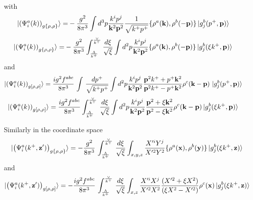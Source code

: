 \documentclass[10pt]{article}
\def\v#1{\mathbf{#1}}
\numberwithin{equation}{section}
\begin{document}
with 
\begin{align}\label{onegrho3mom}
\ket{ \left(\Psi^{a}_{i}(k) \right)_{g \{\rho, \rho\} } }
 = &  
 - \frac{g^2}{8\pi^3}%
  \int d^3p\frac{k^{i}p^{j}} {\v{k}^{2} \v{p}^2 }\frac{1}{\sqrt{k^{+}p^{+}}}
  \{\rho^{a}(\v{k}),\rho^{b}(-\v{p}) \}
  \ket{g_{j}^{b}(p^+,\v{p})}\,
\end{align}
\begin{align}\label{onegrho3}
\ket{ \left(\Psi^{a}_{i}(k) \right)_{g \{\rho, \rho\} } }
 = &  
 - \frac{g^2}{8\pi^3}%
 \int_{\frac{\Lambda}{k^{+}}}^{\frac{\vee}{k^{+}}} \frac{d \xi } {\sqrt{\xi}   }
  \int d^2p\frac{k^{i}p^{j}} {\v{k}^{2} \v{p}^2 } 
  \{\rho^{a}(\v{k}),\rho^{b}(-\v{p}) \}
  \ket{g_{j}^{b}(\xi k^+,\v{p})}\,
\end{align}
and 
\begin{align}\label{onegrho4mom}
  \ket{ \left(\Psi^{a}_{i}(k) \right)_{g [\rho, \rho] } }
 & = 
  \frac{ig^2 f^{abc}}{8\pi^3}\, \int\, \frac{dp^{+}}{\sqrt{k^{+}p^{+}}}
 \int d^2p\frac{k^{i}p^{j}} {\v{k}^{2} \v{p}^2 }  \frac{\v{p}^2 k^{+}+ p^{+} \v{k}^2}{\v{p}^2 k^{+}- p^{+} \v{k}^2}  \rho^{c}(\v{k} -\v{p})\,  \ket{g_{j}^{b}(p^+,\v{p})}\,
\end{align}
\begin{align}\label{onegrho4}
  \ket{ \left(\Psi^{a}_{i}(k) \right)_{g [\rho, \rho] } }
 & = 
  \frac{ig^2 f^{abc}}{8\pi^3}%
 \int_{\frac{\Lambda}{k^{+}}}^{\frac{\vee}{k^{+}}}\, \frac{d \xi } {\sqrt{\xi}   }
 \int d^2p\frac{k^{i}p^{j}} {\v{k}^{2} \v{p}^2 }  \frac{\v{p}^2 + \xi \v{k}^2}{\v{p}^2 - \xi \v{k}^2}  \rho^{c}(\v{k} -\v{p})  \ket{g_{j}^{b}(\xi k^+,\v{p})}\,
\end{align}

Similarly in the coordinate space 
\begin{align}\label{gtworhoX}
  \ket{ \left(\Psi^{a}_{i}(k^+, \v{z}') \right)_{g \{\rho, \rho\} } }
 = -\frac{g^{2}}{8\pi^{3}}\, \int_{\frac{\Lambda}{k^{+}}}^{\frac{\vee}{k^{+}}}\, \frac{d\xi}{\sqrt{\xi}}\int_{x,y,z}\frac{X^{\prime i} Y^{j}}{X^{\prime 2}Y^{2}}\{\rho^{a}(\v{x}),\rho^{b}(\v{y})\} \ket{g^{b}_{j}(\xi k^{+},\v{z})}
\end{align}
and 
\begin{align}\label{gtworhoX2}
  \ket{ \left(\Psi^{a}_{i}(k^+, \v{z}') \right)_{g [\rho, \rho] } }
 = -\frac{ig^{2}f^{abc}}{8\pi^{3}}\, \int_{\frac{\Lambda}{k^{+}}}^{\frac{\vee}{k^{+}}}\, \frac{d\xi}{\sqrt{\xi}} \int_{x,z}\frac{X^{\prime i}X^{j}}{X^{\prime 2}X^{2}}\frac{(X^{\prime 2}+\xi X^{2})}{(\xi X^{2}-X^{\prime 2})}\rho^{c}(\v{x})\ket{g^{b}_{j}(\xi k^{+},\v{z})}
\end{align}
\end{document}
